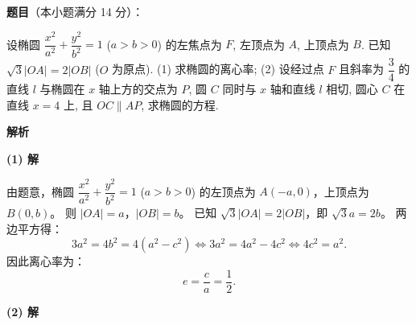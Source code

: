 \begin{answer}

\textbf{题目}（本小题满分 14 分）：

设椭圆 $\dfrac{x^2}{a^2} + \dfrac{y^2}{b^2} = 1$ ($a > b > 0$) 的左焦点为 $F$, 左顶点为 $A$, 上顶点为 $B$. 已知 $\sqrt{3}|OA| = 2|OB|$ ($O$ 为原点).
(1) 求椭圆的离心率;
(2) 设经过点 $F$ 且斜率为 $\dfrac{3}{4}$ 的直线 $l$ 与椭圆在 $x$ 轴上方的交点为 $P$, 圆 $C$ 同时与 $x$ 轴和直线 $l$ 相切, 圆心 $C$ 在直线 $x = 4$ 上, 且 $OC \parallel AP$, 求椭圆的方程.

\textbf{解析}

\textbf{(1) 解}

由题意，椭圆 $\dfrac{x^2}{a^2} + \dfrac{y^2}{b^2} = 1$ ($a > b > 0$) 的左顶点为 $A(-a, 0)$，上顶点为 $B(0, b)$。
则 $|OA| = a$，$|OB| = b$。
已知 $\sqrt{3}|OA| = 2|OB|$，即 $\sqrt{3}a = 2b$。
两边平方得：
\nopagebreak[4]
\[3a^2 = 4b^2 = 4(a^2 - c^2) \iff 3a^2 = 4a^2 - 4c^2 \iff 4c^2 = a^2.\]
因此离心率为：
\nopagebreak[4]
\[e = \frac{c}{a} = \frac{1}{2}.\]

\textbf{(2) 解}


\end{answer}
